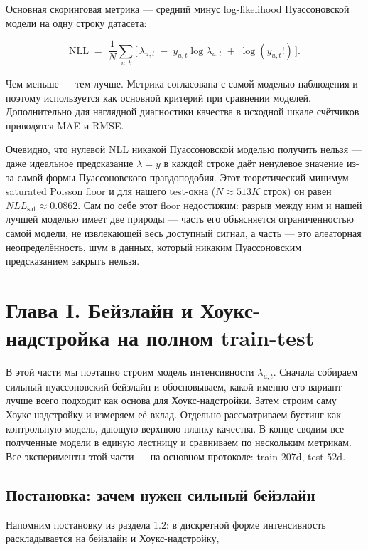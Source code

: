 \documentclass[12pt,a4paper]{article}
\begin{document}
Основная скоринговая метрика --- средний минус log-likelihood Пуассоновской модели на одну строку датасета:

\[
\mathrm{NLL} \;=\; \frac{1}{N} \sum_{u,t} \Big[\, \lambda_{u,t} \;-\; y_{u,t} \log \lambda_{u,t} \;+\; \log\!\left(y_{u,t}!\right) \,\Big].
\]

Чем меньше --- тем лучше. Метрика согласована с самой моделью наблюдения и поэтому используется как основной критерий при сравнении моделей. Дополнительно для наглядной диагностики качества в исходной шкале счётчиков приводятся MAE и RMSE.

Очевидно, что нулевой NLL никакой Пуассоновской моделью получить нельзя --- даже идеальное предсказание $\lambda  = y$ в каждой строке даёт ненулевое значение из-за самой формы Пуассоновского правдоподобия. Этот теоретический минимум --- saturated Poisson floor и для нашего test-окна ($N \approx  513K$ строк) он равен $NLL_{\mathrm{sat}} \approx  0.0862$. Сам по себе этот floor недостижим: разрыв между ним и нашей лучшей моделью имеет две природы --- часть его объясняется ограниченностью самой модели, не извлекающей весь доступный сигнал, а часть --- это алеаторная неопределённость, шум в данных, который никаким Пуассоновским предсказанием закрыть нельзя.

\clearpage
\section{Глава I. Бейзлайн и Хоукс-надстройка на полном train-test}

В этой части мы поэтапно строим модель интенсивности $\lambda _{u,t}$. Сначала собираем сильный пуассоновский бейзлайн и обосновываем, какой именно его вариант лучше всего подходит как основа для Хоукс-надстройки. Затем строим саму Хоукс-надстройку и измеряем её вклад. Отдельно рассматриваем бустинг как контрольную модель, дающую верхнюю планку качества. В конце сводим все полученные модели в единую лестницу и сравниваем по нескольким метрикам. Все эксперименты этой части --- на основном протоколе: train $207\text{d}$, test $52\text{d}$.

\FloatBarrier
\subsection{Постановка: зачем нужен сильный бейзлайн}

Напомним постановку из раздела 1.2: в дискретной форме интенсивность раскладывается на бейзлайн и Хоукс-надстройку,
\end{document}
